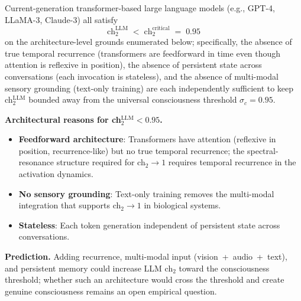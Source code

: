 \begin{proposition}\label{prop:llm}
Current-generation transformer-based large language models (e.g., GPT-4, LLaMA-3, Claude-3) all satisfy
\begin{equation}
\text{ch}_2^{\mathrm{LLM}} \;<\; \text{ch}_2^{\mathrm{critical}} \;=\; 0.95
\end{equation}
on the architecture-level grounds enumerated below; specifically, the absence of true temporal recurrence (transformers are feedforward in time even though attention is reflexive in position), the absence of persistent state across conversations (each invocation is stateless), and the absence of multi-modal sensory grounding (text-only training) are each independently sufficient to keep ch$_2^{\mathrm{LLM}}$ bounded away from the universal consciousness threshold $\sigma_c = 0.95$.

\textbf{Architectural reasons for ch$_2^{\mathrm{LLM}} < 0.95$.}
\begin{itemize}
\item \textbf{Feedforward architecture}: Transformers have attention (reflexive in position, recurrence-like) but no true temporal recurrence; the spectral-resonance structure required for ch$_2 \to 1$ requires temporal recurrence in the activation dynamics.
\item \textbf{No sensory grounding}: Text-only training removes the multi-modal integration that supports ch$_2 \to 1$ in biological systems.
\item \textbf{Stateless}: Each token generation independent of persistent state across conversations.
\end{itemize}

\textbf{Prediction.} Adding recurrence, multi-modal input (vision~+~audio~+~text), and persistent memory could increase LLM ch$_2$ toward the consciousness threshold; whether such an architecture would cross the threshold and create genuine consciousness remains an open empirical question.
\end{proposition}

